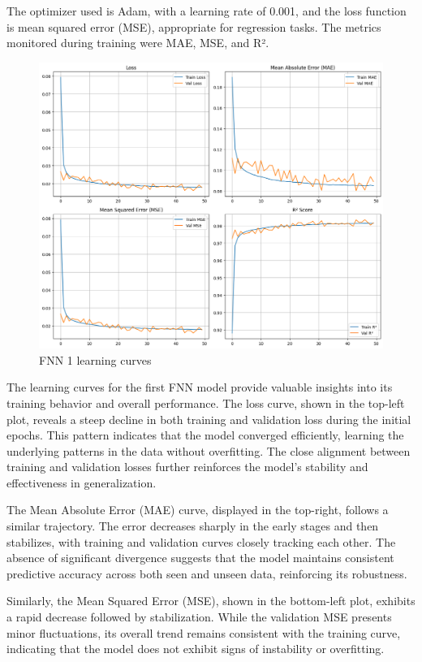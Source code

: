 The optimizer used is Adam, with a learning rate of 0.001, and the loss function is mean squared error (MSE), appropriate for regression tasks. The metrics monitored during training were MAE, MSE, and R².

\begin{figure}[!h]
    \centering
    \includegraphics[width=1\linewidth]{images/FNN0-lc.png}
    \caption{FNN 1 learning curves}
    \label{fig:enter-label}
\end{figure}


The learning curves for the first FNN model provide valuable insights into its training behavior and overall performance. The loss curve, shown in the top-left plot, reveals a steep decline in both training and validation loss during the initial epochs. This pattern indicates that the model converged efficiently, learning the underlying patterns in the data without overfitting. The close alignment between training and validation losses further reinforces the model's stability and effectiveness in generalization.

The Mean Absolute Error (MAE) curve, displayed in the top-right, follows a similar trajectory. The error decreases sharply in the early stages and then stabilizes, with training and validation curves closely tracking each other. The absence of significant divergence suggests that the model maintains consistent predictive accuracy across both seen and unseen data, reinforcing its robustness.

Similarly, the Mean Squared Error (MSE), shown in the bottom-left plot, exhibits a rapid decrease followed by stabilization. While the validation MSE presents minor fluctuations, its overall trend remains consistent with the training curve, indicating that the model does not exhibit signs of instability or overfitting.

